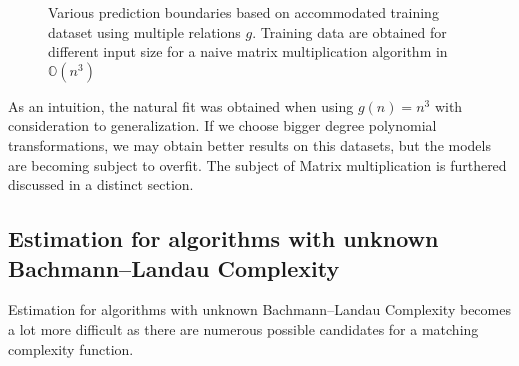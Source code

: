 \begin{figure}[H]
\caption{Various prediction boundaries based on accommodated training dataset using multiple relations $g$. Training data are obtained for different input size for a naive matrix multiplication algorithm in $\mathbb{O}(n^{3})$}
\end{figure}

As an intuition, the natural fit was obtained when using $g(n) = n^3$ with consideration to generalization. If we choose bigger degree polynomial transformations, we may obtain better results on this datasets, but the models are becoming subject to overfit. The subject of Matrix multiplication is furthered discussed in a distinct section. 


\subsection{Estimation for algorithms with unknown Bachmann–Landau Complexity}
Estimation for algorithms with unknown Bachmann–Landau Complexity becomes a lot more difficult as there are numerous possible candidates for a matching complexity function. 

